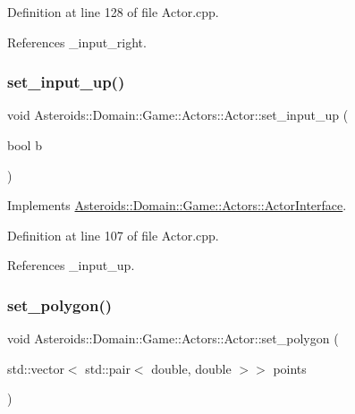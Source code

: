 Definition at line 128 of file Actor.\+cpp.



References \+\_\+input\+\_\+right.

\mbox{\label{classAsteroids_1_1Domain_1_1Game_1_1Actors_1_1Actor_ad633a650d229eee0e3b35f1495d35473}} 
\subsubsection{\texorpdfstring{set\+\_\+input\+\_\+up()}{set\_input\_up()}}
{\footnotesize\ttfamily void Asteroids\+::\+Domain\+::\+Game\+::\+Actors\+::\+Actor\+::set\+\_\+input\+\_\+up (\begin{DoxyParamCaption}\item[{bool}]{b }\end{DoxyParamCaption})\hspace{0.3cm}{\ttfamily [virtual]}}



Implements \hyperlink{classAsteroids_1_1Domain_1_1Game_1_1Actors_1_1ActorInterface_a3f68243b241482302e31c0a4c2fd0588}{Asteroids\+::\+Domain\+::\+Game\+::\+Actors\+::\+Actor\+Interface}.



Definition at line 107 of file Actor.\+cpp.



References \+\_\+input\+\_\+up.

\mbox{\label{classAsteroids_1_1Domain_1_1Game_1_1Actors_1_1Actor_a224abd0a9dff102361ce2a305ba4734f}} 
\subsubsection{\texorpdfstring{set\+\_\+polygon()}{set\_polygon()}}
{\footnotesize\ttfamily void Asteroids\+::\+Domain\+::\+Game\+::\+Actors\+::\+Actor\+::set\+\_\+polygon (\begin{DoxyParamCaption}\item[{std\+::vector$<$ std\+::pair$<$ double, double $>$$>$}]{points }\end{DoxyParamCaption})}



